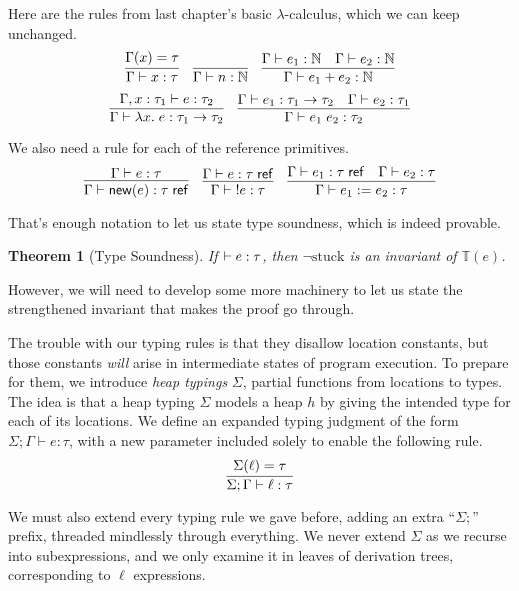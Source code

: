 \documentclass{amsbook}
\newtheorem{theorem}{Theorem}[chapter]
\theoremstyle{definition}
\theoremstyle{remark}
\numberwithin{section}{chapter}
\numberwithin{equation}{chapter}
\begin{document}
Here are the rules from last chapter's basic $\lambda$-calculus, which we can keep unchanged.
$$\infer{\hasty{\Gamma}{x}{\tau}}{
  \msel{\Gamma}{x} = \tau
}
\quad \infer{\hasty{\Gamma}{n}{\mathbb N}}{}
\quad \infer{\hasty{\Gamma}{e_1 + e_2}{\mathbb N}}{
    \hasty{\Gamma}{e_1}{\mathbb N}
    & \hasty{\Gamma}{e_2}{\mathbb N}
}$$
$$\infer{\hasty{\Gamma}{\lambda x. \; e}{\tau_1 \to \tau_2}}{
  \hasty{\Gamma, x : \tau_1}{e}{\tau_2}
}
\quad \infer{\hasty{\Gamma}{e_1 \; e_2}{\tau_2}}{
  \hasty{\Gamma}{e_1}{\tau_1 \to \tau_2}
  & \hasty{\Gamma}{e_2}{\tau_1}
}$$

We also need a rule for each of the reference primitives.
$$\infer{\hasty{\Gamma}{\newref{e}}{\reft{\tau}}}{
  \hasty{\Gamma}{e}{\tau}
}
\quad \infer{\hasty{\Gamma}{\; \readref{e}}{\tau}}{
    \hasty{\Gamma}{e}{\reft{\tau}}
}
\quad \infer{\hasty{\Gamma}{\writeref{e_1}{e_2}}{\tau}}{
  \hasty{\Gamma}{e_1}{\reft{\tau}}
  & \hasty{\Gamma}{e_2}{\tau}
}$$

That's enough notation to let us state type soundness, which is indeed provable.

\begin{theorem}[Type Soundness]
  If $\vdash e : \tau$, then $\neg \textrm{stuck}$ is an invariant of $\mathbb T(e)$.
\end{theorem}

However, we will need to develop some more machinery to let us state the strengthened invariant that makes the proof go through.

\newcommand{\rhasty}[4]{#1; #2 \vdash #3 : #4}

The trouble with our typing rules is that they disallow location constants, but those constants \emph{will} arise in intermediate states of program execution.
To prepare for them, we introduce \emph{heap typings} $\Sigma$, partial functions from locations to types.
The idea is that a heap typing $\Sigma$ models a heap $h$ by giving the intended type for each of its locations.
We define an expanded typing judgment of the form $\rhasty{\Sigma}{\Gamma}{e}{\tau}$, with a new parameter included solely to enable the following rule.
$$\infer{\rhasty{\Sigma}{\Gamma}{\ell}{\tau}}{
  \msel{\Sigma}{\ell} = \tau
}$$

We must also extend every typing rule we gave before, adding an extra ``$\Sigma;$'' prefix, threaded mindlessly through everything.
We never extend $\Sigma$ as we recurse into subexpressions, and we only examine it in leaves of derivation trees, corresponding to $\ell$ expressions.
\end{document}
